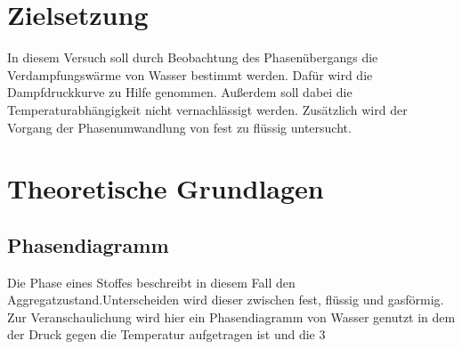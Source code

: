 \section{Zielsetzung}

In diesem Versuch soll durch Beobachtung des Phasenübergangs die 
Verdampfungswärme von Wasser bestimmt werden. Dafür wird die Dampfdruckkurve zu Hilfe genommen.
Außerdem soll dabei die Temperaturabhängigkeit nicht vernachlässigt werden.
Zusätzlich wird der Vorgang der Phasenumwandlung von fest zu flüssig untersucht.
\section{Theoretische Grundlagen}

\subsection{Phasendiagramm}

Die \glqq Phase\grqq{} eines Stoffes beschreibt in diesem Fall den Aggregatzustand.Unterscheiden wird dieser zwischen fest, 
flüssig und gasförmig. 
Zur Veranschaulichung wird hier ein Phasendiagramm von Wasser genutzt in dem der Druck gegen die Temperatur aufgetragen ist und die 3 

